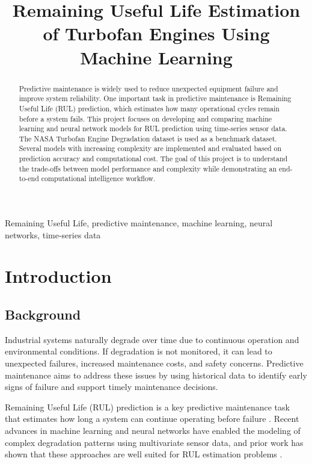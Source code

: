 \documentclass[conference]{IEEEtran}
\title{Remaining Useful Life Estimation of Turbofan Engines Using Machine Learning}
\author{\IEEEauthorblockN{Felix Ikokwu\IEEEauthorrefmark{} and Hunter Antal\IEEEauthorrefmark{}}
\IEEEauthorblockA{\IEEEauthorrefmark{}Faculty of Engineering, Lakehead University, Thunder Bay, ON P7B 5E1, Canada\\
Email: feikokwu@lakeheadu.ca, hbantal@lakeheadu.ca}}
\begin{document}
\maketitle

\begin{abstract}
Predictive maintenance is widely used to reduce unexpected equipment failure and improve system reliability. One important task in predictive maintenance is Remaining Useful Life (RUL) prediction, which estimates how many operational cycles remain before a system fails. This project focuses on developing and comparing machine learning and neural network models for RUL prediction using time-series sensor data. The NASA Turbofan Engine Degradation dataset is used as a benchmark dataset. Several models with increasing complexity are implemented and evaluated based on prediction accuracy and computational cost. The goal of this project is to understand the trade-offs between model performance and complexity while demonstrating an end-to-end computational intelligence workflow.
\end{abstract}

\begin{IEEEkeywords}
Remaining Useful Life, predictive maintenance, machine learning, neural networks, time-series data
\end{IEEEkeywords}

\section{Introduction}

\subsection{Background}
Industrial systems naturally degrade over time due to continuous operation and environmental conditions. If degradation is not monitored, it can lead to unexpected failures, increased maintenance costs, and safety concerns. Predictive maintenance aims to address these issues by using historical data to identify early signs of failure and support timely maintenance decisions.

Remaining Useful Life (RUL) prediction is a key predictive maintenance task that estimates how long a system can continue operating before failure \cite{ref1}. Recent advances in machine learning and neural networks have enabled the modeling of complex degradation patterns using multivariate sensor data, and prior work has shown that these approaches are well suited for RUL estimation problems \cite{ref3}.
\end{document}
